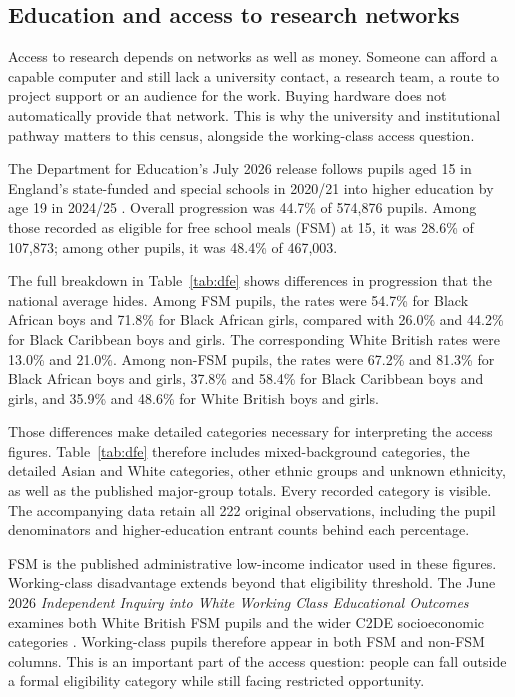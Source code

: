 \subsection{Education and access to research networks}
Access to research depends on networks as well as money.
Someone can afford a capable computer and still lack a university contact,
a research team, a route to project support or an audience for the work.
Buying hardware does not automatically provide that network. This is why
the university and institutional pathway matters to this census, alongside
the working-class access question.

The Department for Education's July 2026 release follows pupils aged 15
in England's state-funded and special schools in 2020/21 into higher
education by age 19 in 2024/25 \cite{dfe2026}. Overall progression was
44.7\% of 574,876 pupils. Among those recorded as eligible for free school
meals (FSM) at 15, it was 28.6\% of 107,873; among other pupils, it was
48.4\% of 467,003.

The full breakdown in Table~\ref{tab:dfe} shows differences in progression
that the national average hides. Among FSM pupils,
the rates were 54.7\% for Black African boys and 71.8\% for Black African
girls, compared with 26.0\% and 44.2\% for Black Caribbean boys and girls.
The corresponding White British rates were 13.0\% and 21.0\%. Among
non-FSM pupils, the rates were 67.2\% and 81.3\% for Black African boys
and girls, 37.8\% and 58.4\% for Black Caribbean boys and girls, and
35.9\% and 48.6\% for White British boys and girls.

Those differences make detailed categories necessary for interpreting the
access figures. Table~\ref{tab:dfe} therefore includes mixed-background
categories, the detailed Asian and White categories, other ethnic groups
and unknown ethnicity, as well as the published major-group totals. Every
recorded category is visible. The accompanying data retain all 222 original
observations, including the pupil denominators and higher-education entrant
counts behind each percentage.



\begin{samepage}
FSM is the published administrative low-income indicator used in these
figures. Working-class disadvantage extends beyond that eligibility
threshold. The June 2026 \emph{Independent Inquiry into White Working Class
Educational Outcomes} examines both White British FSM pupils and the wider
C2DE socioeconomic categories \cite{wwci}. Working-class pupils therefore
appear in both FSM and non-FSM columns. This is an important part of the
access question: people can fall outside a formal eligibility category
while still facing restricted opportunity.\par
\end{samepage}

